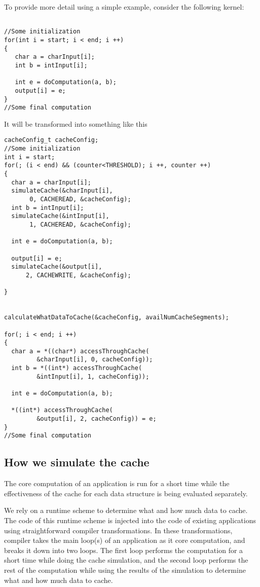 To provide more detail using a simple example, consider the following kernel:

{\footnotesize

\begin{verbatim}

//Some initialization
for(int i = start; i < end; i ++)
{
   char a = charInput[i];
   int b = intInput[i];
 
   int e = doComputation(a, b);
   output[i] = e;
}
//Some final computation
\end{verbatim}
}


It will be transformed into something like this

{\footnotesize
\begin{verbatim}
cacheConfig_t cacheConfig;
//Some initialization
int i = start;
for(; (i < end) && (counter<THRESHOLD); i ++, counter ++)
{
  char a = charInput[i];
  simulateCache(&charInput[i], 
       0, CACHEREAD, &cacheConfig);
  int b = intInput[i];
  simulateCache(&intInput[i], 
       1, CACHEREAD, &cacheConfig);

  int e = doComputation(a, b);

  output[i] = e;
  simulateCache(&output[i], 
      2, CACHEWRITE, &cacheConfig);

}


calculateWhatDataToCache(&cacheConfig, availNumCacheSegments);

for(; i < end; i ++)
{
  char a = *((char*) accessThroughCache(
         &charInput[i], 0, cacheConfig));
  int b = *((int*) accessThroughCache(
         &intInput[i], 1, cacheConfig));

  int e = doComputation(a, b);

  *((int*) accessThroughCache(
         &output[i], 2, cacheConfig)) = e;
}
//Some final computation
\end{verbatim}
}


\subsection{How we simulate the cache}

The core computation of an application is run for a short time while the effectiveness of the cache
for each data structure is being evaluated separately.

We rely on a runtime scheme to determine what and how much data to cache. The code of this runtime scheme is injected
into the code of existing applications using straightforward compiler transformations. In these transformations,
compiler takes the main loop(s) of an application as it core computation, and breaks it down into two loops. The first
loop performs the computation for a short time while doing the cache simulation, and the second loop performs the rest
of the computation while using the results of the simulation to determine what and how much data to cache.


